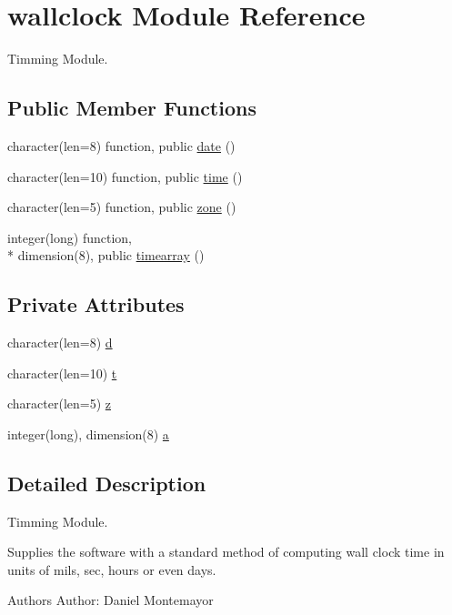 \hypertarget{classwallclock}{\section{wallclock Module Reference}
\label{classwallclock}
}


Timming Module.  


\subsection*{Public Member Functions}
\begin{DoxyCompactItemize}
\item 
character(len=8) function, public \hyperlink{classwallclock_aac2bc47e557d4981f481295bd687dd50}{date} ()
\item 
character(len=10) function, public \hyperlink{classwallclock_a3efb3d12447df7568e0b22b3cd4ed60d}{time} ()
\item 
character(len=5) function, public \hyperlink{classwallclock_ac6bdcdd3cf7fc38f4c738862e2a82dac}{zone} ()
\item 
integer(long) function, \\*
dimension(8), public \hyperlink{classwallclock_ac691a026a7b92c6cd971e86d0449d42b}{timearray} ()
\end{DoxyCompactItemize}
\subsection*{Private Attributes}
\begin{DoxyCompactItemize}
\item 
character(len=8) \hyperlink{classwallclock_a0922e57a4f1a99af864f31246c132d4c}{d}
\item 
character(len=10) \hyperlink{classwallclock_a8a94eeecb39db73f1c36c9b00a95c9f7}{t}
\item 
character(len=5) \hyperlink{classwallclock_a47a8e5d4efccd0142b0587c873dad88b}{z}
\item 
integer(long), dimension(8) \hyperlink{classwallclock_a634d56ca30b98ea804c6d33a0a635ec0}{a}
\end{DoxyCompactItemize}


\subsection{Detailed Description}
Timming Module. 

Supplies the software with a standard method of computing wall clock time in units of mils, sec, hours or even days. \begin{DoxyAuthor}{Authors}
Author\-: Daniel Montemayor 
\end{DoxyAuthor}


